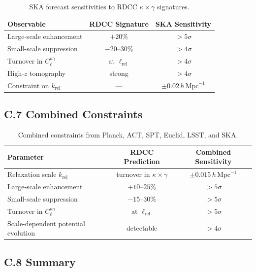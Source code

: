 \documentclass[11pt,a4paper]{article}
\begin{document}
\begin{table}[H]
\centering
\begin{tabular}{lcc}
\hline
\textbf{Observable} & \textbf{RDCC Signature} & \textbf{SKA Sensitivity} \\
\hline
Large-scale enhancement & $+20\%$ & $>5\sigma$ \\
Small-scale suppression & $-20$--$30\%$ & $>4\sigma$ \\
Turnover in $C_{\ell}^{\kappa\gamma}$ & at $\ell_{\mathrm{rel}}$ & $>4\sigma$ \\
High-$z$ tomography & strong & $>4\sigma$ \\
Constraint on $k_{\mathrm{rel}}$ & --- & $\pm 0.02\,h\,\mathrm{Mpc}^{-1}$ \\
\hline
\end{tabular}
\caption{SKA forecast sensitivities to RDCC $\kappa \times \gamma$ signatures.}
\end{table}

\subsection*{C.7 Combined Constraints}

\begin{table}[H]
\centering
\begin{tabular}{lcc}
\hline
\textbf{Parameter} & \textbf{RDCC Prediction} & \textbf{Combined Sensitivity} \\
\hline
Relaxation scale $k_{\mathrm{rel}}$ & turnover in $\kappa \times \gamma$ & $\pm 0.015\,h\,\mathrm{Mpc}^{-1}$ \\
Large-scale enhancement & $+10$--$25\%$ & $>5\sigma$ \\
Small-scale suppression & $-15$--$30\%$ & $>5\sigma$ \\
Turnover in $C_{\ell}^{\kappa\gamma}$ & at $\ell_{\mathrm{rel}}$ & $>5\sigma$ \\
Scale-dependent potential evolution & detectable & $>4\sigma$ \\
\hline
\end{tabular}
\caption{Combined constraints from Planck, ACT, SPT, Euclid, LSST, and SKA.}
\end{table}

\subsection*{C.8 Summary}
\end{document}

